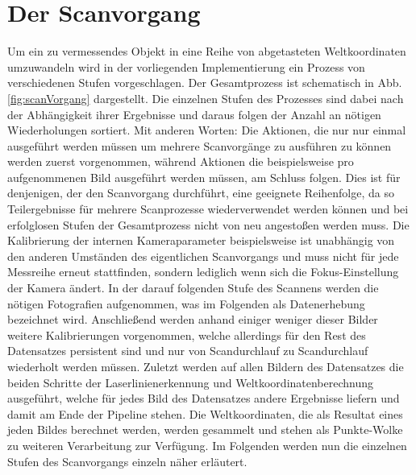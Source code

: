 \section{Der Scanvorgang}
\label{sec:scanvorgang}
Um ein zu vermessendes Objekt in eine Reihe von abgetasteten Weltkoordinaten umzuwandeln wird in der vorliegenden Implementierung ein Prozess von verschiedenen Stufen vorgeschlagen. Der Gesamtprozess ist schematisch in Abb. \ref{fig:scanVorgang} dargestellt. Die einzelnen Stufen des Prozesses sind dabei nach der Abhängigkeit ihrer Ergebnisse und daraus folgen der Anzahl an nötigen Wiederholungen sortiert. Mit anderen Worten: Die Aktionen, die nur nur einmal ausgeführt werden müssen um mehrere Scanvorgänge zu ausführen zu können werden zuerst vorgenommen, während Aktionen die beispielsweise pro aufgenommenen Bild ausgeführt werden müssen, am Schluss folgen. Dies ist für denjenigen, der den Scanvorgang durchführt, eine geeignete Reihenfolge, da so Teilergebnisse für mehrere Scanprozesse wiederverwendet werden können und bei erfolglosen Stufen der Gesamtprozess nicht von neu angestoßen werden muss. \bigbreak
Die Kalibrierung der internen Kameraparameter beispielsweise ist unabhängig von den anderen Umständen des eigentlichen Scanvorgangs und muss nicht für jede Messreihe erneut stattfinden, sondern lediglich wenn sich die Fokus-Einstellung der Kamera ändert. In der darauf folgenden Stufe des Scannens werden die nötigen Fotografien aufgenommen, was im Folgenden als Datenerhebung bezeichnet wird. Anschließend werden anhand einiger weniger dieser Bilder weitere Kalibrierungen vorgenommen, welche allerdings für den Rest des Datensatzes persistent sind und nur von Scandurchlauf zu Scandurchlauf wiederholt werden müssen. Zuletzt werden auf allen Bildern des Datensatzes die beiden Schritte der Laserlinienerkennung und Weltkoordinatenberechnung ausgeführt, welche für jedes Bild des Datensatzes andere Ergebnisse liefern und damit am Ende der Pipeline stehen. Die Weltkoordinaten, die als Resultat eines jeden Bildes berechnet werden, werden gesammelt und stehen als Punkte-Wolke zu weiteren Verarbeitung zur Verfügung. Im Folgenden werden nun die einzelnen Stufen des Scanvorgangs einzeln näher erläutert.


